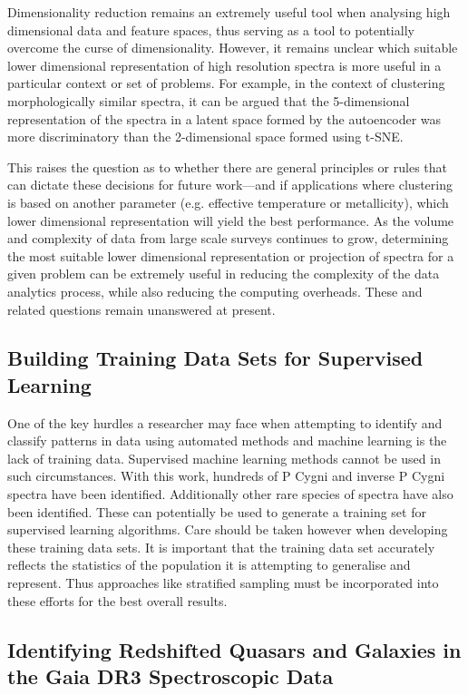 Dimensionality reduction remains an extremely useful tool when analysing high dimensional data and feature spaces, thus serving as a tool to potentially overcome the curse of dimensionality. However, it remains unclear which suitable lower dimensional representation of high resolution spectra is more useful in a particular context or set of problems. For example, in the context of clustering morphologically similar spectra, it can be argued that the 5-dimensional representation of the spectra in a latent space formed by the autoencoder was more discriminatory than the 2-dimensional space formed using t-SNE. 

This raises the question as to whether there are general principles or rules that can dictate these decisions for future work—and if applications where clustering is based on another parameter (e.g. effective temperature or metallicity), which lower dimensional representation will yield the best performance. As the volume and complexity of data from large scale surveys continues to grow, determining the most suitable lower dimensional representation or projection of spectra for a given problem can be extremely useful in reducing the complexity of the data analytics process, while also reducing the computing overheads. These and related questions remain unanswered at present.

\subsection{Building Training Data Sets for Supervised Learning}

One of the key hurdles a researcher may face when attempting to identify and classify patterns in data using automated methods and machine learning is the lack of training data. Supervised machine learning methods cannot be used in such circumstances. With this work, hundreds of P Cygni and inverse P Cygni spectra have been identified. Additionally other rare species of spectra have also been identified. These can potentially be used to generate a training set for supervised learning algorithms. Care should be taken however when developing these training data sets. It is important that the training data set accurately reflects the statistics of the population it is attempting to generalise and represent. Thus approaches like stratified sampling must be incorporated into these efforts for the best overall results. 

\subsection{Identifying Redshifted Quasars and Galaxies in the Gaia DR3 Spectroscopic Data}

